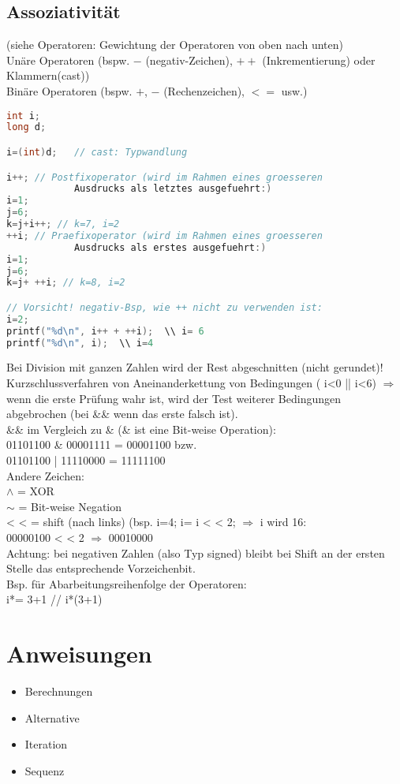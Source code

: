 \subsection{Assoziativität}
(siehe Operatoren: Gewichtung der Operatoren von oben nach unten)\medskip\\
Unäre Operatoren (bspw. $-$ (negativ-Zeichen), $++$ (Inkrementierung) oder Klammern(cast))\\
Binäre Operatoren (bspw. $+$, $-$ (Rechenzeichen), $<=$ usw.)
\begin{lstlisting}[language=C]
int i;
long d;

i=(int)d;	// cast: Typwandlung

i++; // Postfixoperator (wird im Rahmen eines groesseren 
			Ausdrucks als letztes ausgefuehrt:)
i=1;
j=6;
k=j+i++; // k=7, i=2
++i; // Praefixoperator (wird im Rahmen eines groesseren 
			Ausdrucks als erstes ausgefuehrt:)
i=1;
j=6;
k=j+ ++i; // k=8, i=2

// Vorsicht! negativ-Bsp, wie ++ nicht zu verwenden ist:
i=2;
printf("%d\n", i++ + ++i);	\\ i= 6
printf("%d\n", i);	\\ i=4
\end{lstlisting}
Bei Division mit ganzen Zahlen wird der Rest abgeschnitten (nicht gerundet)!\medskip\\
Kurzschlussverfahren von Aneinanderkettung von Bedingungen ( i<0 || i<6) $\Rightarrow$ wenn die erste Prüfung wahr ist, wird der Test weiterer Bedingungen abgebrochen (bei \&\& wenn das erste falsch ist).\bigskip\\
\&\& im Vergleich zu \& (\& ist eine Bit-weise Operation): \\
01101100 \& 00001111 = 00001100 bzw. \\
01101100 | 11110000 = 11111100 \smallskip\\
Andere Zeichen: \\
$\wedge$ = XOR\\
$\sim$ = Bit-weise Negation\\
<\! < = shift (nach links) (bsp. i=4; i= i <\! < 2; $\Rightarrow$ i wird 16:\\
00000100 <\! < 2 $\Rightarrow$ 00010000\\
Achtung: bei negativen Zahlen (also Typ signed) bleibt bei Shift an der ersten Stelle das entsprechende Vorzeichenbit.\\
Bsp. für Abarbeitungsreihenfolge der Operatoren:\\
i*= 3+1		// i*(3+1)
\section{Anweisungen}
\begin{itemize}
\item Berechnungen
\item Alternative
\item Iteration
\item Sequenz
\end{itemize}
